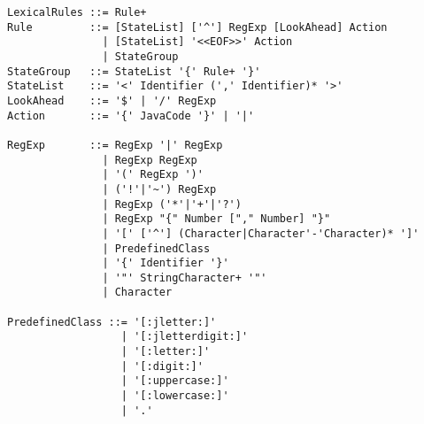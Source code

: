\documentclass[11pt]{scrartcl}
\begin{document}
\begin{verbatim}
LexicalRules ::= Rule+ 
Rule         ::= [StateList] ['^'] RegExp [LookAhead] Action 
               | [StateList] '<<EOF>>' Action
               | StateGroup 
StateGroup   ::= StateList '{' Rule+ '}' 
StateList    ::= '<' Identifier (',' Identifier)* '>' 
LookAhead    ::= '$' | '/' RegExp
Action       ::= '{' JavaCode '}' | '|'

RegExp       ::= RegExp '|' RegExp 
               | RegExp RegExp 
               | '(' RegExp ')'
               | ('!'|'~') RegExp
               | RegExp ('*'|'+'|'?')
               | RegExp "{" Number ["," Number] "}" 
               | '[' ['^'] (Character|Character'-'Character)* ']' 
               | PredefinedClass 
               | '{' Identifier '}' 
               | '"' StringCharacter+ '"' 
               | Character 

PredefinedClass ::= '[:jletter:]' 
                  | '[:jletterdigit:]' 
                  | '[:letter:]' 
                  | '[:digit:]' 
                  | '[:uppercase:]' 
                  | '[:lowercase:]' 
                  | '.' 
\end{verbatim}
\end{document}

